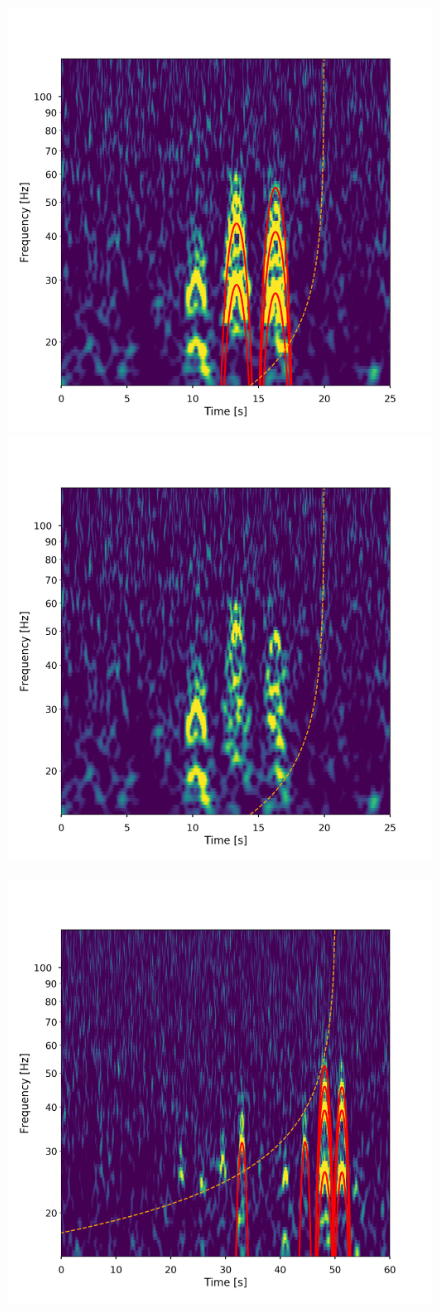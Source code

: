 \begin{figure}
  \centering
  \begin{minipage}[t]{1.0\linewidth}
    \includegraphics[width=0.49\linewidth]{images/4_archenemy/Section4/4.1/BBH_H1_loud_Original.pdf}
    \hspace{0.02\linewidth}
    \includegraphics[width=0.49\linewidth]{images/4_archenemy/Section4/4.1/BBH_H1_loud_Subtracted.pdf}
  \end{minipage}
  \begin{minipage}[t]{1.0\linewidth}
    \includegraphics[width=0.49\linewidth]{images/4_archenemy/Section4/4.1/NSBH_H1_loud_Original.pdf}
    \hspace{0.02\linewidth}

\end{minipage}
\end{figure}
